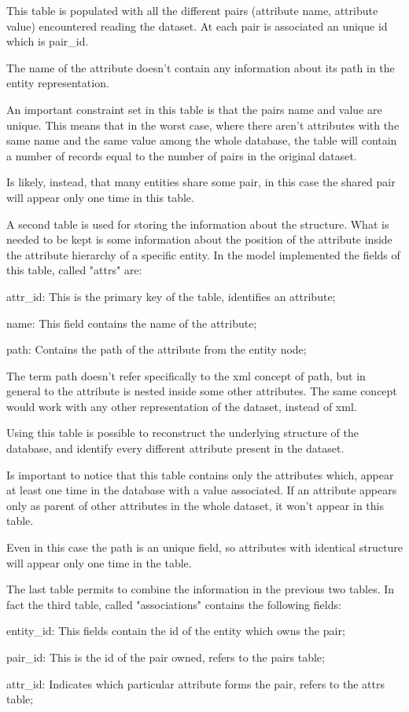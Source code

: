 \documentclass{acm_proc_article-sp-sigmod07}
\begin{document}
This table is populated with all the different pairs (attribute name,
attribute value) encountered reading the dataset. At each pair is
associated an unique id which is pair\_id.

The name of the attribute doesn't contain any information about its path
in the entity representation.

An important constraint set in this table is that the pairs name and value
are unique. This means that in the worst case, where there aren't
attributes with the same name and the same value among the whole database,
the table will contain a number of records equal to the number of pairs in
the original dataset.

Is likely, instead, that many entities share some pair, in this case the
shared pair will appear only one time in this table.

A second table is used for storing the information about the structure.
What is needed to be kept is some information about the position of the
attribute inside the attribute hierarchy of a specific entity.
In the model implemented the fields of this table, called "attrs" are:
\begin{description}
\item{attr\_id: } This is the primary key of the table, identifies an
attribute;
\item{name: } This field contains the name of the attribute;
\item{path: } Contains the path of the attribute from the entity node;
\end{description}

The term path doesn't refer specifically to the xml concept of path, but
in general to the attribute is nested inside some other attributes.
The same concept would work with any other representation of the dataset,
instead of xml.

Using this table is possible to reconstruct the underlying structure of
the database, and identify every different attribute present in the
dataset.

Is important to notice that this table contains only the attributes which,
appear at least one time in the database with a value associated.
If an attribute appears only as parent of other attributes in the whole
dataset, it won't appear in this table.

Even in this case the path is an unique field, so attributes with
identical structure will appear only one time in the table.

The last table permits to combine the information in the previous two
tables.
In fact the third table, called "associations" contains the following
fields:
\begin{description}
\item{entity\_id: } This fields contain the id of the entity which owns
the pair;
\item{pair\_id: } This is the id of the pair owned, refers to the pairs
table;
\item{attr\_id: } Indicates which particular attribute forms the pair,
refers to the attrs table;
\end{description}
\end{document}

